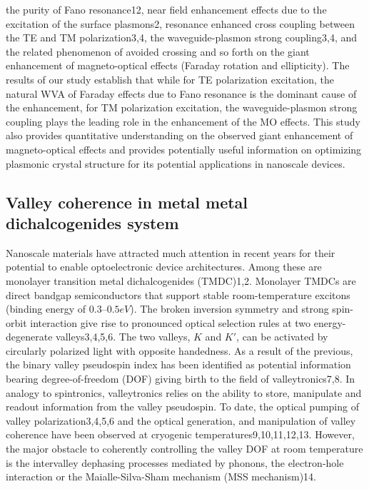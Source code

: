 \documentclass[13pt]{article}
\begin{document}
the purity of Fano resonance12, near field enhancement effects due to the excitation of the surface plasmons2, resonance enhanced cross coupling between the TE and TM polarization3,4, the waveguide-plasmon strong coupling3,4, and the related phenomenon of avoided crossing and so forth on the giant enhancement of magneto-optical effects (Faraday rotation and ellipticity). The results of our study establish that while for TE polarization excitation, the natural WVA of Faraday effects due to Fano resonance is the dominant cause of the enhancement, for TM polarization excitation, the waveguide-plasmon strong coupling plays the leading role in the enhancement of the MO effects. This study also provides quantitative understanding on the observed giant enhancement of magneto-optical effects and provides potentially useful information on optimizing plasmonic crystal structure for its potential applications in nanoscale devices.
\subsection{Valley coherence in metal metal dichalcogenides system}
\noindent
\par 
	Nanoscale materials have attracted much attention in recent years for their potential to enable optoelectronic device architectures. Among these are monolayer transition metal dichalcogenides (TMDC)1,2. Monolayer TMDCs are direct bandgap semiconductors that support stable room-temperature excitons (binding energy of $0.3–0.5 eV$). The broken inversion symmetry and strong spin-orbit interaction give rise to pronounced optical selection rules at two energy-degenerate valleys3,4,5,6. The two valleys, $K$ and $K'$, can be activated by circularly polarized light with opposite handedness. As a result of the previous, the binary valley pseudospin index has been identified as potential information bearing degree-of-freedom (DOF) giving birth to the field of valleytronics7,8.
	In analogy to spintronics, valleytronics relies on the ability to store, manipulate and readout information from the valley pseudospin. To date, the optical pumping of valley polarization3,4,5,6 and the optical generation, and manipulation of valley coherence have been observed at cryogenic temperatures9,10,11,12,13. However, the major obstacle to coherently controlling the valley DOF at room temperature is the intervalley dephasing processes mediated by phonons, the electron-hole interaction or the Maialle-Silva-Sham mechanism (MSS mechanism)14.
\end{document}
